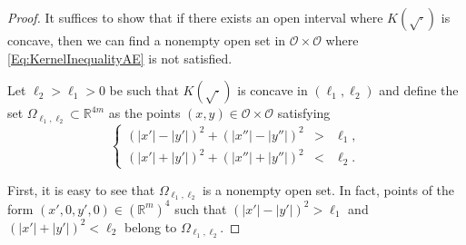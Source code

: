 \documentclass[12pt,reqno]{amsart}
\theoremstyle{definition}
\theoremstyle{remark}
\newcommand{\con}[1]{\mathbb{#1}}
\newcommand{\R}{\con{R}} %
\newcommand{\ocal}{\mathcal{O}}
\newcommand\beqc[1]{\left\{\begin{array}{#1}}
\newcommand\eeqc{\end{array} \right.}
\def\PDEsystem{rcll}
\numberwithin{equation}{section}
\begin{document}
	\begin{proof}
		It suffices to show that if there exists an open interval where $K(\sqrt{\cdot})$ is concave, then we can find a nonempty open set in $\ocal \times \ocal$ where \eqref{Eq:KernelInequalityAE} is not satisfied.
		
		Let $\ell_2>\ell_1>0$ be such that $K(\sqrt{\cdot})$ is concave in $(\ell_1,\ell_2)$ and define the set $\Omega_{\ell_1,\ell_2}\subset \R^{4m}$ as the points $(x,y)\in \ocal\times \ocal$ satisfying
		\begin{equation}
		\label{Eq:OmegaSetDefinition}
		\beqc{\PDEsystem}
		(|x'|-|y'|)^2+(|x''|-|y''|)^2&>&\ell_1,\\
		(|x'|+|y'|)^2+(|x''|+|y''|)^2&<&\ell_2.
		\eeqc
		\end{equation}
		
		First, it is easy to see that $\Omega_{\ell_1,\ell_2}$ is a nonempty open set. In fact, points of the form $(x',0,y',0)\in (\R^m)^4$ such that $(|x'|-|y'|)^2>\ell_1$ and $(|x'|+|y'|)^2 <\ell_2$ belong to $\Omega_{\ell_1,\ell_2}$. 
		

\end{proof}
\end{document}
